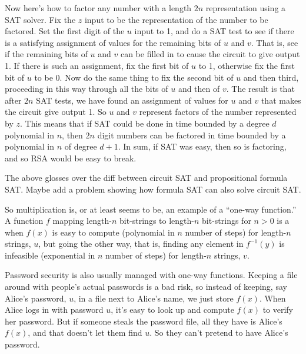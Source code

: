 Now here's how to factor any number with a length $2n$ representation
using a SAT solver.  Fix the $z$ input to be the representation of the
number to be factored.  Set the first digit of the $u$ input to 1, and
do a SAT test to see if there is a satisfying assignment of values for
the remaining bits of $u$ and $v$.  That is, see if the remaining bits
of $u$ and $v$ can be filled in to cause the circuit to give output 1.
If there is such an assignment, fix the first bit of $u$ to 1,
otherwise fix the first bit of $u$ to be 0.  Now do the same thing to
fix the second bit of $u$ and then third, proceeding in this way
through all the bits of $u$ and then of $v$.  The result is that after
$2n$ SAT tests, we have found an assignment of values for $u$ and $v$
that makes the circuit give output 1.  So $u$ and $v$ represent
factors of the number represented by $z$.  This means that if SAT
could be done in time bounded by a degree $d$ polynomial in $n$, then
$2n$ digit numbers can be factored in time bounded by a polynomial in
$n$ of degree $d+1$.  In sum, if SAT was easy, then so is factoring,
and so RSA would be easy to break.

\begin{editingnotes}
\end{editingnotes}

\begin{editingnotes}
The above glosses over the diff between circuit SAT and propositional
formula SAT.  Maybe add a problem showing how formula SAT can also
solve circuit SAT.
\end{editingnotes}

\iffalse

So multiplication is, or at least seems to be, an example of a
``one-way function.''  A function $f$ mapping length-$n$ bit-strings
to length-$n$ bit-strings for $n > 0$ is a 
when $f(x)$ is easy to compute (polynomial in $n$ number of steps) for
length-$n$ strings, $u$, but going the other way, that is, finding any
element in $f^{-1}(y)$ is infeasible (exponential in $n$ number of
steps) for length-$n$ strings, $v$.

Password security is also usually managed with one-way functions.
Keeping a file around with people's actual passwords is a bad risk, so
instead of keeping, say Alice's password, $u$, in a file next to
Alice's name, we just store $f(x)$.  When Alice logs in with password
$u$, it's easy to look up and compute $f(x)$ to verify her password.
But if someone steals the password file, all they have is Alice's
$f(x)$, and that doesn't let them find $u$.  So they can't pretend to
have Alice's password.

